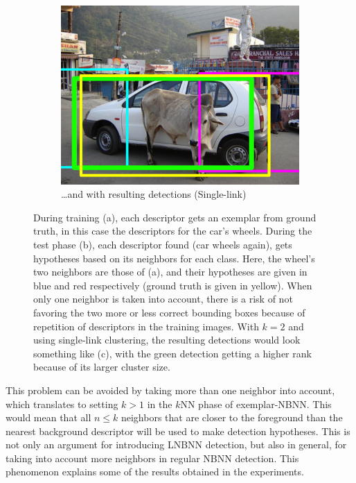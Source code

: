 \begin{figure}[hbt]
    ~
    \begin{subfigure}[b]{0.3\textwidth}
        \centering
        \includegraphics[width=\textwidth]{aliasing3}
        \caption{\ldots and with resulting detections (Single-link)}
        \label{fig:aliasdet}
    \end{subfigure}
    \caption{During training (a), each descriptor gets an exemplar from ground truth, in this case the descriptors for the car's wheels. During the test phase (b), each descriptor found (car wheels again), gets hypotheses based on its neighbors for each class. Here, the wheel's two neighbors are those of (a), and their hypotheses are given in blue and red respectively (ground truth is given in yellow). When only one neighbor is taken into account, there is a risk of not favoring the two more or less correct bounding boxes because of repetition of descriptors in the training images. With $k=2$ and using single-link clustering, the resulting detections would look something like (c), with the green detection getting a higher rank because of its larger cluster size.}
    \label{fig:aliasing}
\end{figure}

This problem can be avoided by taking more than one neighbor into account, which translates to setting $k>1$ in the $k$NN phase of exemplar-NBNN. This would mean that all $n\leq k$ neighbors that are closer to the foreground than the nearest background descriptor will be used to make detection hypotheses. This is not only an argument for introducing LNBNN detection, but also in general, for taking into account more neighbors in regular NBNN detection. This phenomenon explains some of the results obtained in the experiments.


